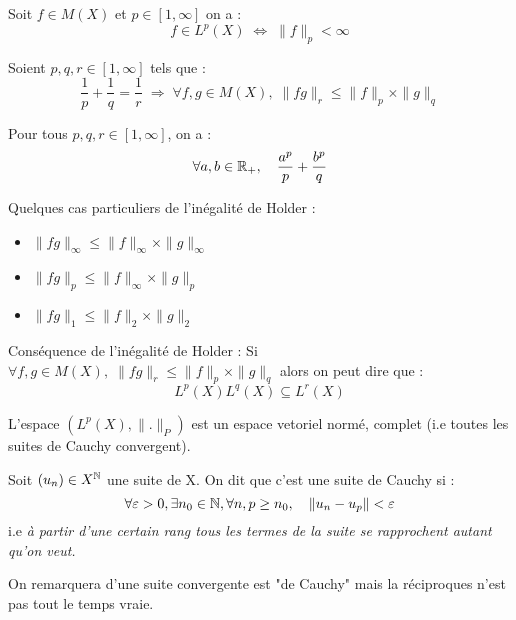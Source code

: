 \begin{prop}
    Soit $f \in M(X)$ et $p \in [1,\infty]$ on a :
        \[ f \in L^p(X) \; \Longleftrightarrow \; \|f\|_p < \infty \]
\end{prop}

\begin{theorem}
    Soient $p,q,r \in [1,\infty]$ tels que :
        \[ \boxed{ \frac{1}{p} + \frac{1}{q} = \frac{1}{r} \; \Longrightarrow \; \forall f,g \in M(X), \; \|fg\|_r \leq \|f\|_p \times \|g\|_q } \] 
\end{theorem}

\begin{theorem}
    Pour tous $p,q,r \in [1,\infty]$, on a :
        \[ \forall a,b \in \mathbb{R}_+, \quad \frac{a^p}{p} + \frac{b^p}{q} \] 
\end{theorem}

\begin{remark} 
    Quelques cas particuliers de l'inégalité de Holder :
    
    \begin{itemize}
        \item $ \|fg\|_\infty \leq \| f \|_\infty \times \|g\|_\infty $
        \item $ \|fg\|_p \leq \|f\|_\infty \times \|g\|_p $
        \item $ \|fg\|_1 \leq \|f\|_2 \times \|g\|_2 $
    \end{itemize}
\end{remark}

\begin{remark} Conséquence de l'inégalité de Holder :
    Si $ \forall f,g \in M(X), \; \|fg\|_r \leq \|f\|_p \times \|g\|_q$ alors on peut dire que :
        \[ L^p(X) L^q(X) \subseteq L^r(X) \] 
\end{remark}

\begin{theorem}
    L'espace $(L^p(X), \|.\|_P)$ est un espace vetoriel normé, complet
    (i.e toutes les suites de Cauchy convergent).
\end{theorem}

\begin{remark}
    Soit $(u_n) \in X^{\mathbb{N}}$ une suite de X. On dit que c'est une suite de Cauchy si :
        \[ \forall \varepsilon > 0, \exists n_0 \in \mathbb{N}, \forall n,p \geq n_0, \quad \| u_n - u_p\| < \varepsilon \] 
    i.e \emph{à partir d'une certain rang tous les termes de la suite se rapprochent autant qu'on veut.}
    
    On remarquera d'une suite convergente est "de Cauchy" mais la réciproques n'est pas tout le temps vraie. 
\end{remark}

